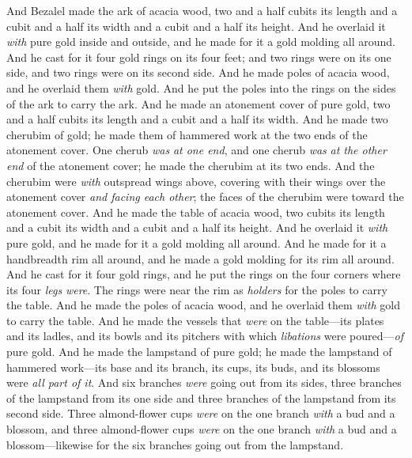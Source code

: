 \begin{biblechapter} %
 And Bezalel made the ark of acacia wood, two and a half cubits its length and a cubit and a half its width and a cubit and a half its height.
\verse And he overlaid it \textit{with} pure gold inside and outside, and he made for it a gold molding all around.
\verse And he cast for it four gold rings on its four feet; and two rings were on its one side, and two rings were on its second side.
\verse And he made poles of acacia wood, and he overlaid them \textit{with} gold.
\verse And he put the poles into the rings on the sides of the ark to carry the ark.
\verse And he made an atonement cover of pure gold, two and a half cubits its length and a cubit and a half its width.
\verse And he made two cherubim of gold; he made them of hammered work at the two ends of the atonement cover.
\verse One cherub \textit{was} \textit{at one end}, and one cherub \textit{was} \textit{at the other end} of the atonement cover; he made the cherubim at its two ends.
\verse And the cherubim were \textit{with} outspread wings above, covering with their wings over the atonement cover \textit{and facing each other}; the faces of the cherubim were toward the atonement cover.
 And he made the table of acacia wood, two cubits its length and a cubit its width and a cubit and a half its height.
\verse And he overlaid it \textit{with} pure gold, and he made for it a gold molding all around.
\verse And he made for it a handbreadth rim all around, and he made a gold molding for its rim all around.
\verse And he cast for it four gold rings, and he put the rings on the four corners where its four \textit{legs} \textit{were}.
\verse The rings were near the rim as \textit{holders} for the poles to carry the table.
\verse And he made the poles of acacia wood, and he overlaid them \textit{with} gold to carry the table.
\verse And he made the vessels that \textit{were} on the table—its plates and its ladles, and its bowls and its pitchers with which \textit{libations} were poured—\textit{of} pure gold.
\verse And he made the lampstand of pure gold; he made the lampstand of hammered work—its base and its branch, its cups, its buds, and its blossoms were \textit{all part of it}.
\verse And six branches \textit{were} going out from its sides, three branches of the lampstand from its one side and three branches of the lampstand from its second side.
\verse Three almond-flower cups \textit{were} on the one branch \textit{with} a bud and a blossom, and three almond-flower cups \textit{were} on the one branch \textit{with} a bud and a blossom—likewise for the six branches going out from the lampstand.

\end{biblechapter}

